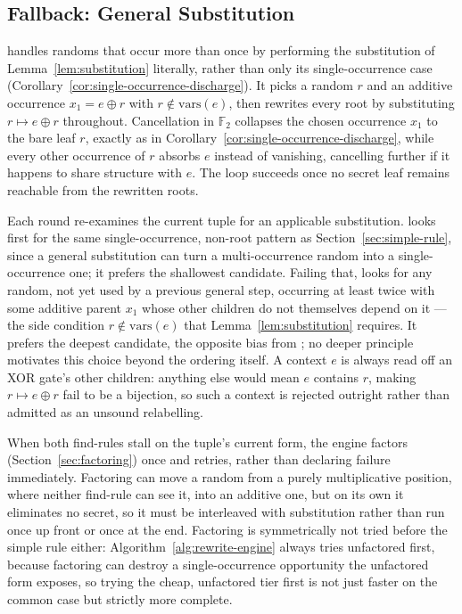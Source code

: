   \subsection{Fallback: General Substitution}
  \label{sec:general-substitution}

   handles randoms that occur more than once by performing
  the substitution of Lemma~\ref{lem:substitution} literally, rather than only its
  single-occurrence case (Corollary~\ref{cor:single-occurrence-discharge}). It picks
  a random $r$ and an additive occurrence $x_1 = e \oplus r$ with
  $r \notin \mathrm{vars}(e)$, then rewrites every root by substituting
  $r \mapsto e \oplus r$ throughout. Cancellation in $\mathbb{F}_2$ collapses the
  chosen occurrence $x_1$ to the bare leaf $r$, exactly as in
  Corollary~\ref{cor:single-occurrence-discharge}, while every other occurrence of
  $r$ absorbs $e$ instead of vanishing, cancelling further if it happens to share
  structure with $e$. The loop succeeds once no secret leaf remains reachable from
  the rewritten roots.

  Each round re-examines the current tuple for an applicable substitution.
   looks first for the same single-occurrence, non-root pattern
  as Section~\ref{sec:simple-rule}, since a general substitution can turn a
  multi-occurrence random into a single-occurrence one; it prefers the shallowest
  candidate. Failing that,  looks for any random, not yet used
  by a previous general step, occurring at least twice with some additive parent
  $x_1$ whose other children do not themselves depend on it --- the side condition
  $r \notin \mathrm{vars}(e)$ that Lemma~\ref{lem:substitution} requires. It prefers
  the deepest candidate, the opposite bias from ; no deeper
  principle motivates this choice beyond the ordering itself. A context $e$ is always
  read off an XOR gate's other children: anything else would mean $e$ contains $r$,
  making $r \mapsto e \oplus r$ fail to be a bijection, so such a context is rejected
  outright rather than admitted as an unsound relabelling.

  When both find-rules stall on the tuple's current form, the engine factors
  (Section~\ref{sec:factoring}) once and retries, rather than declaring failure
  immediately. Factoring can move a random from a purely multiplicative position,
  where neither find-rule can see it, into an additive one, but on its own it
  eliminates no secret, so it must be interleaved with substitution rather than run
  once up front or once at the end. Factoring is symmetrically not tried before the
  simple rule either: Algorithm~\ref{alg:rewrite-engine} always tries
   unfactored first, because factoring can destroy a
  single-occurrence opportunity the unfactored form exposes, so trying the cheap,
  unfactored tier first is not just faster on the common case but strictly more
  complete.

